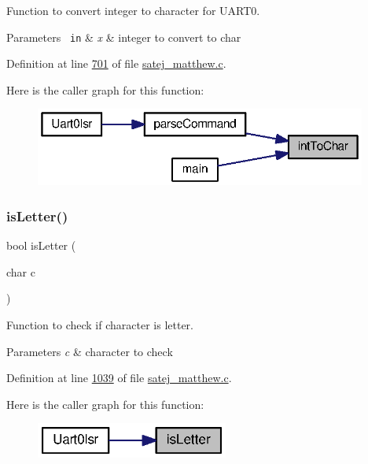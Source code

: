 Function to convert integer to character for U\+A\+R\+T0. 


\begin{DoxyParams}[1]{Parameters}
\mbox{\texttt{ in}}  & {\em x} & integer to convert to char \\
\hline
\end{DoxyParams}


Definition at line \mbox{\hyperlink{satej__matthew_8c_source_l00701}{701}} of file \mbox{\hyperlink{satej__matthew_8c_source}{satej\+\_\+matthew.\+c}}.

Here is the caller graph for this function\+:
\nopagebreak
\begin{figure}[H]
\begin{center}
\leavevmode
\includegraphics[width=309pt]{satej__matthew_8c_a48ff33038777eac27bf41ff14b9368bf_icgraph}
\end{center}
\end{figure}
\mbox{\label{satej__matthew_8c_a19ec769227acc123bfe1e2d225a211cb}} 
\subsubsection{\texorpdfstring{isLetter()}{isLetter()}}
{\footnotesize\ttfamily bool is\+Letter (\begin{DoxyParamCaption}\item[{char}]{c }\end{DoxyParamCaption})}



Function to check if character is letter. 


\begin{DoxyParams}{Parameters}
{\em c} & character to check \\
\hline
\end{DoxyParams}


Definition at line \mbox{\hyperlink{satej__matthew_8c_source_l01039}{1039}} of file \mbox{\hyperlink{satej__matthew_8c_source}{satej\+\_\+matthew.\+c}}.

Here is the caller graph for this function\+:
\nopagebreak
\begin{figure}[H]
\begin{center}
\leavevmode
\includegraphics[width=179pt]{satej__matthew_8c_a19ec769227acc123bfe1e2d225a211cb_icgraph}
\end{center}
\end{figure}
\mbox{\label{satej__matthew_8c_a65b1640156c68ea7687a41428022c1d8}} 
